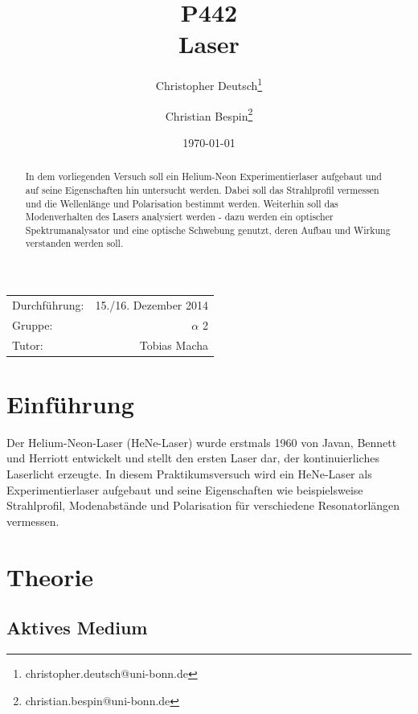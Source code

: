 \documentclass[11pt, a4paper]{article}
\title{P442 \\ Laser}
\author{Christopher Deutsch\footnote{christopher.deutsch@uni-bonn.de} \and Christian Bespin\footnote{christian.bespin@uni-bonn.de}}
\date{\today}
\numberwithin{equation}{section}
\begin{document}
\begin{titlepage}

\maketitle

\begin{center}
\begin{tabular}{l r}
Durchführung: & 15./16. Dezember 2014 \\
Gruppe: & $\alpha$ 2 \\
Tutor: & Tobias Macha
\end{tabular}
\end{center}

\begin{abstract}
\noindent
In dem vorliegenden Versuch soll ein Helium-Neon Experimentierlaser aufgebaut und auf seine Eigenschaften hin untersucht werden.
Dabei soll das Strahlprofil vermessen und die Wellenlänge und Polarisation bestimmt werden.
Weiterhin soll das Modenverhalten des Lasers analysiert werden - dazu werden ein optischer Spektrumanalysator und eine optische Schwebung genutzt, deren Aufbau und Wirkung verstanden werden soll.
\end{abstract}

\end{titlepage}

\tableofcontents
\newpage


\section{Einführung}

Der Helium-Neon-Laser (HeNe-Laser) wurde erstmals 1960 von Javan, Bennett und Herriott \cite{javan} entwickelt und stellt den ersten Laser dar, der kontinuierliches Laserlicht erzeugte.
In diesem Praktikumsversuch wird ein HeNe-Laser als Experimentierlaser aufgebaut und seine Eigenschaften wie beispielsweise Strahlprofil, Modenabstände und Polarisation für verschiedene Resonatorlängen vermessen.

\section{Theorie}

\subsection{Aktives Medium}
\end{document}
